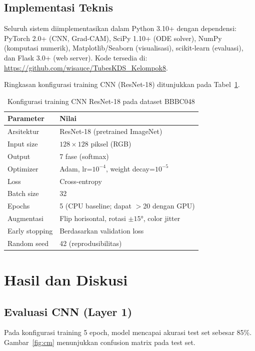 \documentclass[conference]{IEEEtran}
\begin{document}
\subsection{Implementasi Teknis}

Seluruh sistem diimplementasikan dalam Python 3.10+ dengan dependensi: PyTorch 2.0+ (CNN, Grad-CAM), SciPy 1.10+ (ODE solver), NumPy (komputasi numerik), Matplotlib/Seaborn (visualisasi), scikit-learn (evaluasi), dan Flask 3.0+ (web server). Kode tersedia di: \url{https://github.com/wisauce/TubesKDS_Kelompok8}.

Ringkasan konfigurasi training CNN (ResNet-18) ditunjukkan pada Tabel~\ref{tab:train_config}.

\begin{table}[!t]
\centering
\caption{Konfigurasi training CNN ResNet-18 pada dataset BBBC048}
\label{tab:train_config}
\footnotesize
\begin{tabular}{@{}ll@{}}
\toprule
\textbf{Parameter} & \textbf{Nilai} \\
\midrule
Arsitektur & ResNet-18 (pretrained ImageNet) \\
Input size & $128 \times 128$ piksel (RGB) \\
Output & 7 fase (softmax) \\
Optimizer & Adam, lr=$10^{-4}$, weight decay=$10^{-5}$ \\
Loss & Cross-entropy \\
Batch size & 32 \\
Epochs & 5 (CPU baseline; dapat $>$20 dengan GPU) \\
Augmentasi & Flip horisontal, rotasi $\pm15°$, color jitter \\
Early stopping & Berdasarkan validation loss \\
Random seed & 42 (reprodusibilitas) \\
\bottomrule
\end{tabular}
\end{table}

\section{Hasil dan Diskusi}

\subsection{Evaluasi CNN (Layer 1)}

Pada konfigurasi training 5 epoch, model mencapai akurasi test set sebesar 85\%. Gambar~\ref{fig:cm} menunjukkan confusion matrix pada test set. 
\end{document}
